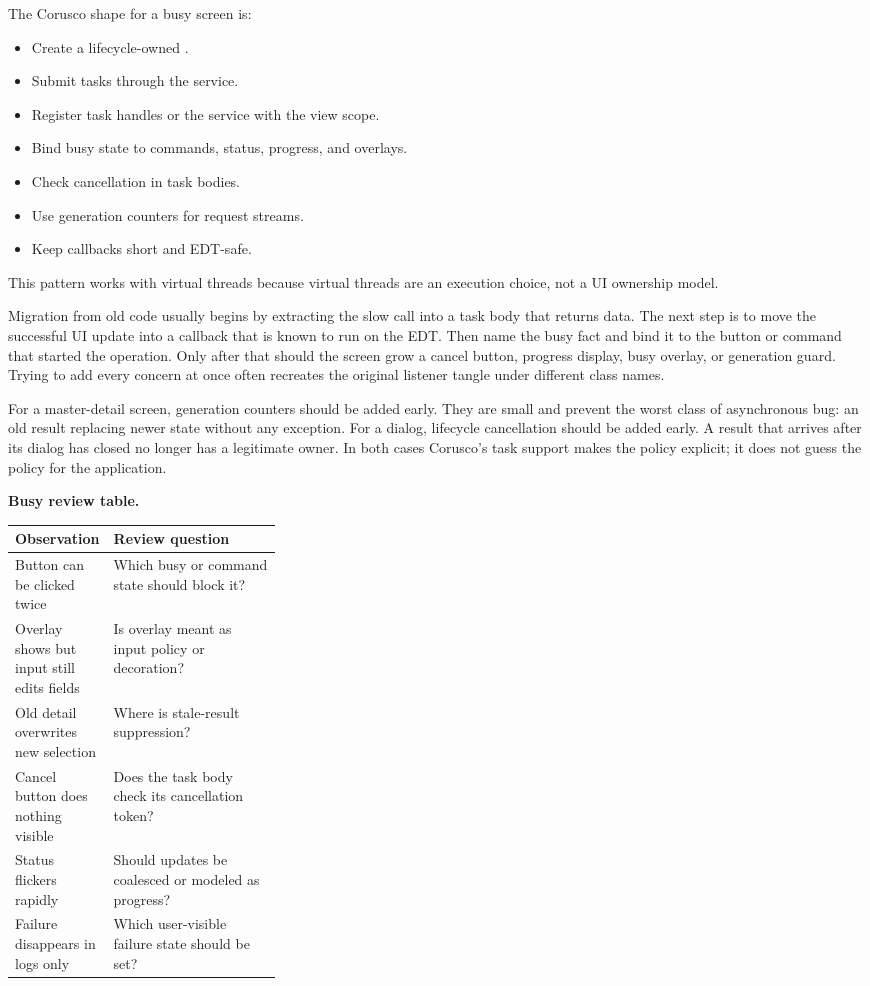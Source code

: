 The Corusco shape for a busy screen is:

\begin{itemize}
\item Create a lifecycle-owned .
\item Submit tasks through the service.
\item Register task handles or the service with the view scope.
\item Bind busy state to commands, status, progress, and overlays.
\item Check cancellation in task bodies.
\item Use generation counters for request streams.
\item Keep callbacks short and EDT-safe.
\end{itemize}

This pattern works with virtual threads because virtual threads are an execution
choice, not a UI ownership model.

Migration from old code usually begins by extracting the slow call into a task
body that returns data. The next step is to move the successful UI update into
a callback that is known to run on the EDT. Then name the busy fact and bind it
to the button or command that started the operation. Only after that should the
screen grow a cancel button, progress display, busy overlay, or generation
guard. Trying to add every concern at once often recreates the original
listener tangle under different class names.

For a master-detail screen, generation counters should be added early. They are
small and prevent the worst class of asynchronous bug: an old result replacing
newer state without any exception. For a dialog, lifecycle cancellation should
be added early. A result that arrives after its dialog has closed no longer has
a legitimate owner. In both cases Corusco's task support makes the policy
explicit; it does not guess the policy for the application.

\begin{center}
\textbf{Busy review table.}
\end{center}

\noindent\begin{tabularx}{\linewidth}{@{}p{0.31\linewidth}X@{}}
\toprule
Observation & Review question\\
\midrule
Button can be clicked twice & Which busy or command state should block it?\\
Overlay shows but input still edits fields & Is overlay meant as input policy or decoration?\\
Old detail overwrites new selection & Where is stale-result suppression?\\
Cancel button does nothing visible & Does the task body check its cancellation token?\\
Status flickers rapidly & Should updates be coalesced or modeled as progress?\\
Failure disappears in logs only & Which user-visible failure state should be set?\\
\bottomrule
\end{tabularx}

